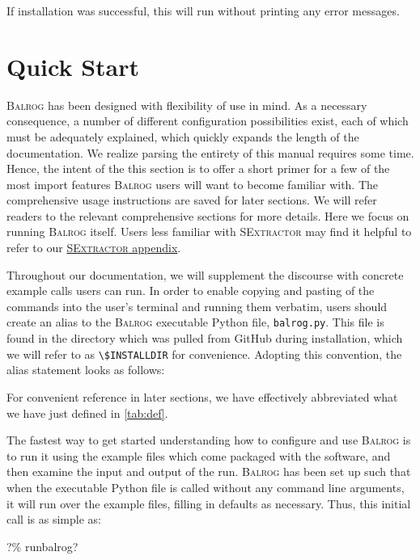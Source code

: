 \documentclass[11pt]{book}
\newcommand{\codett}[1]{\lstinline{#1}}
\newcommand{\py}{Python}
\newcommand{\balrog}{\textsc{Balrog}}
\newcommand{\sex}{\textsc{SExtractor}}
\newcommand{\bcmd}{\% runbalrog}
\begin{document}
\noindent If installation was successful, this will run without printing any error messages.

\chapter{Quick Start}
\label{sec:quick}

\balrog{} has been designed with flexibility of use in mind. As a necessary consequence, 
a number of different configuration possibilities exist, each of which must be
adequately explained, which quickly expands the length of the documentation.
We realize parsing the entirety of this manual requires some time.
Hence, the intent of the this section is to offer a short primer for a few of the most import features
\balrog{} users will want to become familiar with.
The comprehensive usage instructions are saved for later sections.
We will refer readers to the relevant comprehensive sections for more details.
Here we focus on running \balrog{} itself.
Users less familiar with \sex{} may find it helpful to refer to our \hyperref[sec:quicksex]{\sex{} appendix}.

Throughout our documentation, we will supplement the discourse with concrete example calls users can run.
In order to enable copying and pasting of the commands into the user's terminal and running them verbatim,
users should create an alias to the \balrog{} executable \py{} file, \codett{balrog.py}. 
This file is found in the directory which was pulled from GitHub during installation,
which we will refer to as \codett{\$INSTALLDIR} for convenience.
Adopting this convention, the alias statement looks as follows:

\begin{cmdline}
\end{cmdline}

\noindent For convenient reference in later sections, we have effectively 
abbreviated what we have just defined in \autoref{tab:def}.

The fastest way to get started understanding how to configure and use \balrog{} is to
run it using the example files which come packaged with the software, and then examine the input
and output of the run. 
\balrog{} has been set up such that when the executable \py{}
file is called without any command line arguments, it will run over
the example files, filling in defaults as necessary. 
Thus, this initial call is as simple as:

\begin{cmdline}
?\bcmd{}?
\end{cmdline}
\end{document}
